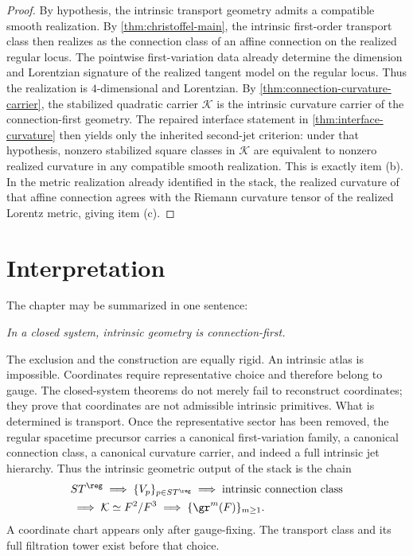 \begin{proof}
	By hypothesis, the intrinsic transport geometry admits a compatible
	smooth realization.  By \cref{thm:christoffel-main}, the intrinsic
	first-order transport class then realizes as the connection class of
	an affine connection on the realized regular locus.
	The pointwise first-variation data already determine the dimension and
	Lorentzian signature of the realized tangent model on the regular
	locus.  Thus the realization is \(4\)-dimensional and Lorentzian.
	By \cref{thm:connection-curvature-carrier}, the stabilized quadratic
	carrier \(\mathcal K\) is the intrinsic curvature carrier of the
	connection-first geometry.  The repaired interface statement in
	\cref{thm:interface-curvature} then yields only the inherited
	second-jet criterion: under that hypothesis, nonzero stabilized
	square classes in \(\mathcal K\) are equivalent to nonzero realized
	curvature in any compatible smooth realization.  This is exactly item
	\textup{(b)}.
	In the metric realization already identified in the stack, the
	realized curvature of that affine connection agrees with the Riemann
	curvature tensor of the realized Lorentz metric, giving item
	\textup{(c)}.
\end{proof}
\section{Interpretation}
\label{sec:connection-interpretation}
The chapter may be summarized in one sentence:
\medskip
\centerline{\emph{In a closed system, intrinsic geometry is
		connection-first.}}
\medskip
The exclusion and the construction are equally rigid.
An intrinsic atlas is impossible.  Coordinates require representative
choice and therefore belong to gauge.  The closed-system theorems do not
merely fail to reconstruct coordinates; they prove that coordinates are
not admissible intrinsic primitives.
What is determined is transport.  Once the representative sector has been
removed, the regular spacetime precursor carries a canonical
first-variation family, a canonical connection class, a canonical
curvature carrier, and indeed a full intrinsic jet hierarchy.
Thus the intrinsic geometric output of the stack is the chain
\[
	\begin{aligned}
		 & ST^{\reg}
		\;\Longrightarrow\;
		\{V_p\}_{p\in ST^{\reg}}
		\;\Longrightarrow\;
		\text{intrinsic connection class}
		\\
		 & \;\Longrightarrow\;
		\mathcal K\simeq F^2/F^3
		\;\Longrightarrow\;
		\{\gr^m(F)\}_{m\ge 1}.
	\end{aligned}
\]
A coordinate chart appears only after gauge-fixing.  The transport class
and its full filtration tower exist before that choice.
